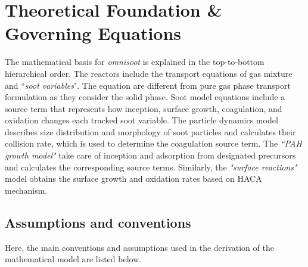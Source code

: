 \section{Theoretical Foundation \& Governing Equations}
The mathematical basis for \textit{omnisoot} is explained in the top-to-bottom hierarchical order. The reactors include the transport equations of gas mixture and ``\textit{soot variables}". The equation are different from pure gas phase transport formulation as they consider the solid phase. Soot model equations include a source term that represents how inception, surface growth, coagulation, and oxidation changes each tracked soot variable. The particle dynamics model describes size distribution and morphology of soot particles and calculates their collision rate, which is used to determine the coagulation source term. The \textit{``PAH growth model"} take care of inception and adsorption from designated precursors and calculates the corresponding source terms. Similarly, the \textit{"surface reactions"} model obtains the surface growth and oxidation rates based on HACA mechanism. 

\subsection{Assumptions and conventions}
Here, the main conventions and assumptions used in the derivation of the mathematical model are listed below.

